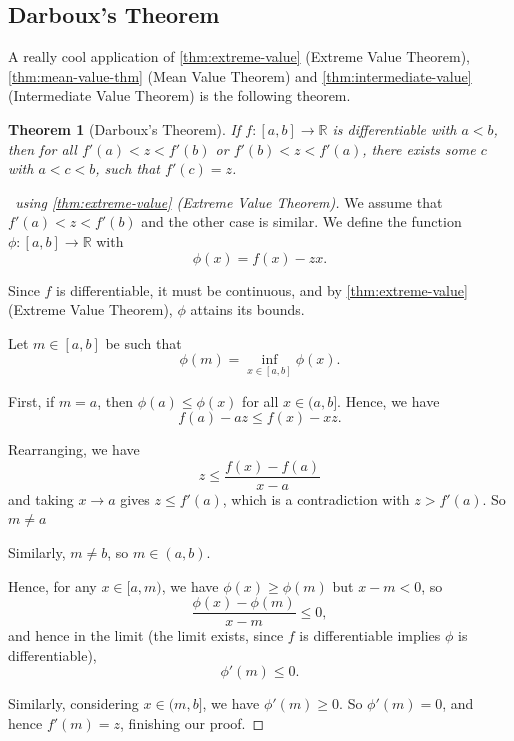 \documentclass[11pt]{article}
\numberwithin{equation}{section}
\newtheorem{theorem}{Theorem}[section]
\theoremstyle{definition}
\theoremstyle{remark}
\newcommand{\pqty}[1]{\left(#1\right)}
\newcommand{\ccintv}[2]{[#1,#2]}
\newcommand{\oointv}[2]{(#1,#2)}
\newcommand{\cointv}[2]{[#1,#2)}
\newcommand{\ocintv}[2]{(#1,#2]}
\newcommand{\functiondomain}[3]{#1:#2\to #3}
\newcommand{\RR}{\mathbb R}
\begin{document}
\subsection{Darboux's Theorem}

A really cool application of \autoref{thm:extreme-value} (Extreme Value Theorem), \autoref{thm:mean-value-thm} (Mean Value Theorem) and \autoref{thm:intermediate-value} (Intermediate Value Theorem) is the following theorem.

\begin{theorem}[Darboux's Theorem]\label{analysis-unit-0123}
    If \(\functiondomain{f}{\ccintv{a}{b}}{\RR}\) is differentiable with \(a < b\), then for all \(f'\pqty{a} < z < f'\pqty{b}\) or \(f'\pqty{b} < z < f'\pqty{a}\), there exists some \(c\) with \(a < c < b\), such that \(f'\pqty{c} = z\).
\end{theorem}

\begin{proof}[\proofname\ using \autoref{thm:extreme-value} (Extreme Value Theorem)]
    We assume that \(f'\pqty{a} < z < f'\pqty{b}\) and the other case is similar. We define the function \(\functiondomain{\phi}{\ccintv{a}{b}}{\RR}\) with
    \[
        \phi\pqty{x} = f\pqty{x} - zx.
    \]

    Since \(f\) is differentiable, it must be continuous, and by \autoref{thm:extreme-value} (Extreme Value Theorem), \(\phi\) attains its bounds.

    Let \(m \in \ccintv{a}{b}\) be such that
    \[
        \phi\pqty{m} = \inf_{x \in \ccintv{a}{b}} \phi\pqty{x}.
    \]

    First, if \(m = a\), then \(\phi\pqty{a} \leq \phi\pqty{x}\) for all \(x \in \ocintv{a}{b}\). Hence, we have
    \[
        f\pqty{a} - az \leq f\pqty{x} - xz.
    \]

    Rearranging, we have
    \[
        z \leq \frac{f\pqty{x} - f\pqty{a}}{x - a}
    \]
    and taking \(x \to a\) gives \(z \leq f'\pqty{a}\), which is a contradiction with \(z > f'\pqty{a}\). So \(m \neq a\)

    Similarly, \(m \neq b\), so \(m \in \oointv{a}{b}\).

    Hence, for any \(x \in \cointv{a}{m}\), we have \(\phi\pqty{x} \geq \phi\pqty{m}\) but \(x - m < 0\), so
    \[
        \frac{\phi\pqty{x} - \phi\pqty{m}}{x - m} \leq 0,
    \]
    and hence in the limit (the limit exists, since \(f\) is differentiable implies \(\phi\) is differentiable),
    \[
        \phi'\pqty{m} \leq 0.
    \]

    Similarly, considering \(x \in \ocintv{m}{b}\), we have \(\phi'\pqty{m} \geq 0\). So \(\phi'\pqty{m} = 0\), and hence \(f'\pqty{m} = z\), finishing our proof.
\end{proof}
\end{document}
